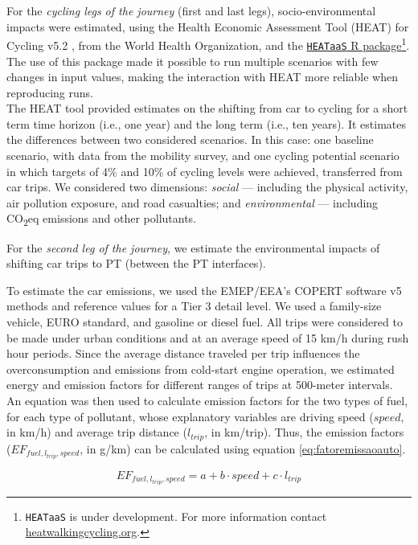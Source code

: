 \documentclass[review, doubleblind, 3p,
authoryear]{elsarticle} %
\begin{document}
For the \emph{cycling legs of the journey} (first and last legs),
socio-environmental impacts were estimated, using the Health Economic
Assessment Tool (HEAT) for Cycling v5.2 \citep{HEAT}, from the World
Health Organization, and the
\href{https://github.com/HEAT-WHO/HEAT_heatr_api}{\texttt{HEATaaS} R
package}\footnote{\texttt{HEATaaS} is under development. For more
  information contact
  \href{https://heatwalkingcycling.org}{heatwalkingcycling.org}.}. The
use of this package made it possible to run multiple scenarios with few
changes in input values, making the interaction with HEAT more reliable
when reproducing runs.\\
The HEAT tool provided estimates on the shifting from car to cycling for
a short term time horizon (i.e., one year) and the long term (i.e., ten
years). It estimates the differences between two considered scenarios.
In this case: one baseline scenario, with data from the mobility survey,
and one cycling potential scenario in which targets of 4\% and 10\% of
cycling levels were achieved, transferred from car trips. We considered
two dimensions: \emph{social} --- including the physical activity, air
pollution exposure, and road casualties; and \emph{environmental} ---
including CO\textsubscript{2}eq emissions and other pollutants.

For the \emph{second leg of the journey}, we estimate the environmental
impacts of shifting car trips to PT (between the PT interfaces).

To estimate the car emissions, we used the EMEP/EEA's COPERT software v5
methods and reference values \citep{COPERT} for a Tier 3 detail level.
We used a family-size vehicle, EURO standard, and gasoline or diesel
fuel. All trips were considered to be made under urban conditions and at
an average speed of 15 km/h during rush hour periods. Since the average
distance traveled per trip influences the overconsumption and emissions
from cold-start engine operation, we estimated energy and emission
factors for different ranges of trips at 500-meter intervals.\\
An equation was then used to calculate emission factors for the two
types of fuel, for each type of pollutant, whose explanatory variables
are driving speed (\(speed\), in km/h) and average trip distance
(\(l_{trip}\), in km/trip). Thus, the emission factors
(\(EF_{fuel,l_{trip},speed}\), in g/km) can be calculated using equation
\ref{eq:fatoremissaoauto}.

\begin{equation}\label{eq:fatoremissaoauto}
{EF}_{fuel,l_{trip},speed} = a + b\cdot {speed} + c\cdot l_{trip}
\end{equation}
\end{document}

